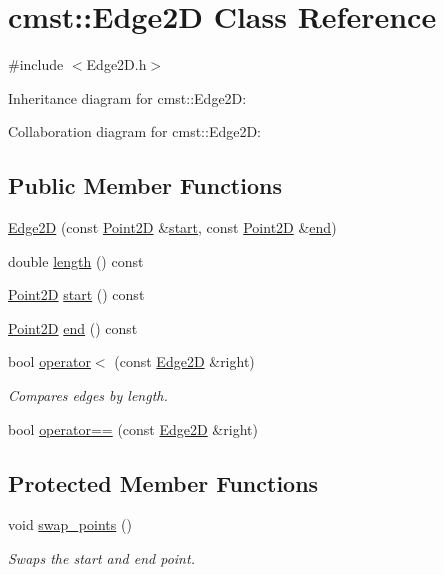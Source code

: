 \hypertarget{classcmst_1_1_edge2_d}{}\section{cmst::Edge2D Class Reference}
\label{classcmst_1_1_edge2_d}


{\ttfamily \#include $<$Edge2D.h$>$}



Inheritance diagram for cmst::Edge2D:


Collaboration diagram for cmst::Edge2D:
\subsection*{Public Member Functions}
\begin{DoxyCompactItemize}
\item 
\hyperlink{classcmst_1_1_edge2_d_a0d1166315f84757395e889d3225e2ae0}{Edge2D} (const \hyperlink{classcmst_1_1_point2_d}{Point2D} \&\hyperlink{classcmst_1_1_edge2_d_ad77218c63818fe92f43033ba1487ab89}{start}, const \hyperlink{classcmst_1_1_point2_d}{Point2D} \&\hyperlink{classcmst_1_1_edge2_d_af02d43d8344759ac3709d318e26cdcee}{end})
\item 
double \hyperlink{classcmst_1_1_edge2_d_adaa859c8f6b412e1174abe8d8b429ce9}{length} () const 
\item 
\hyperlink{classcmst_1_1_point2_d}{Point2D} \hyperlink{classcmst_1_1_edge2_d_ad77218c63818fe92f43033ba1487ab89}{start} () const 
\item 
\hyperlink{classcmst_1_1_point2_d}{Point2D} \hyperlink{classcmst_1_1_edge2_d_af02d43d8344759ac3709d318e26cdcee}{end} () const 
\item 
bool \hyperlink{classcmst_1_1_edge2_d_a58bd75e0a118f5192f5811cfacb6e7ac}{operator$<$} (const \hyperlink{classcmst_1_1_edge2_d}{Edge2D} \&right)
\begin{DoxyCompactList}\small\item\em Compares edges by length. \end{DoxyCompactList}\item 
bool \hyperlink{classcmst_1_1_edge2_d_a1609ff699d629d691bf054acd2deb187}{operator==} (const \hyperlink{classcmst_1_1_edge2_d}{Edge2D} \&right)
\end{DoxyCompactItemize}
\subsection*{Protected Member Functions}
\begin{DoxyCompactItemize}
\item 
void \hyperlink{classcmst_1_1_edge2_d_aeb88dc66750f6c7967de0918e906abf4}{swap\_points} ()
\begin{DoxyCompactList}\small\item\em Swaps the start and end point. \end{DoxyCompactList}\end{DoxyCompactItemize}
